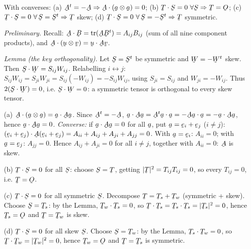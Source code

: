 \begin{problem}
With converses: (a) $\bA^{t}=-\bA\Rightarrow\bA\cdot(\ba\otimes\ba)=0$;
(b) $\bT\cdot\bS=0\ \forall\bS\Rightarrow\bT=\Ob$;
(c) $\bT\cdot\bS=0\ \forall\,\bS=\bS^t\Rightarrow\bT$ skew;
(d) $\bT\cdot\bS=0\ \forall\,\bS=-\bS^t\Rightarrow\bT$ symmetric.
\end{problem}
\begin{solution}
\emph{Preliminary.} Recall: $\bA\cdot\bB=\tr(\bA\bB^t)=A_{ij}B_{ij}$
(sum of all nine component products), and
$\bA\cdot(\bu\otimes\bv)=\ip\bu{\bA\bv}$.

\emph{Lemma (the key orthogonality).}
Let $\bS=\bS^t$ be symmetric and $\bW=-\bW^t$ skew. Then
$\bS\cdot\bW=S_{ij}W_{ij}$. Relabelling $i\leftrightarrow j$:
$S_{ij}W_{ij}=S_{ji}W_{ji}=S_{ij}(-W_{ij})=-S_{ij}W_{ij}$, using
$S_{ji}=S_{ij}$ and $W_{ji}=-W_{ij}$. Thus $2(\bS\cdot\bW)=0$, i.e.
$\bS\cdot\bW=0$: a symmetric tensor is orthogonal to every skew tensor.

(a) $\bA\cdot(\ba\otimes\ba)=\ip\ba{\bA\ba}$. Since $\bA^t=-\bA$,
$\ip\ba{\bA\ba}=\ip{\bA^t\ba}\ba=\ip{-\bA\ba}\ba=-\ip\ba{\bA\ba}$,
hence $\ip\ba{\bA\ba}=0$. \emph{Converse:} if
$\ip\ba{\bA\ba}=0$ for all $\ba$, put $\ba=\be_i+\be_j$ ($i\neq j$):
$\ip{(\be_i+\be_j)}{\bA(\be_i+\be_j)}=A_{ii}+A_{ij}+A_{ji}+A_{jj}=0$.
With $\ba=\be_i$: $A_{ii}=0$; with $\ba=\be_j$: $A_{jj}=0$. Hence
$A_{ij}+A_{ji}=0$ for all $i\neq j$, together with $A_{ii}=0$: $\bA$ is
skew.

(b) $\bT\cdot\bS=0$ for all $\bS$: choose $\bS=\bT$, getting
$|\bT|^2=T_{ij}T_{ij}=0$, so every $T_{ij}=0$, i.e. $\bT=\Ob$.

(c) $\bT\cdot\bS=0$ for all symmetric $\bS$. Decompose
$\bT=\bT_s+\bT_w$ (symmetric + skew). Choose $\bS=\bT_s$: by the Lemma,
$\bT_w\cdot\bT_s=0$, so $\bT\cdot\bT_s=\bT_s\cdot\bT_s=|\bT_s|^2=0$,
hence $\bT_s=\Ob$ and $\bT=\bT_w$ is skew.

(d) $\bT\cdot\bS=0$ for all skew $\bS$. Choose $\bS=\bT_w$: by the Lemma,
$\bT_s\cdot\bT_w=0$, so $\bT\cdot\bT_w=|\bT_w|^2=0$, hence $\bT_w=\Ob$
and $\bT=\bT_s$ is symmetric.
\end{solution}

